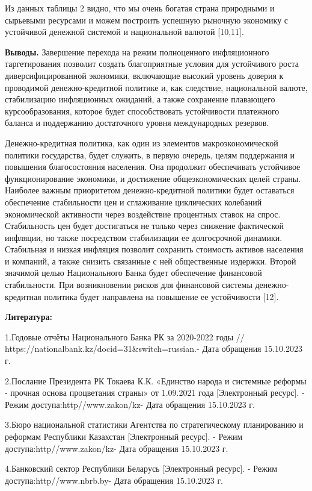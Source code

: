 Из данных таблицы 2 видно, что мы очень богатая страна природными и
сырьевыми ресурсами и можем построить успешную рыночную экономику с
устойчивой денежной системой и национальной валютой {[}10,11{]}.

{\bfseries Выводы.} Завершение перехода на режим полноценного инфляционного
таргетирования позволит создать благоприятные условия для устойчивого
роста диверсифицированной экономики, включающие высокий уровень доверия
к проводимой денежно-кредитной политике и, как следствие, национальной
валюте, стабилизацию инфляционных ожиданий, а также сохранение
плавающего курсообразования, которое будет способствовать устойчивости
платежного баланса и поддержанию достаточного уровня международных
резервов.

Денежно-кредитная политика, как один из элементов макроэкономической
политики государства, будет служить, в первую очередь, целям поддержания
и повышения благосостояния населения. Она продолжит обеспечивать
устойчивое функционирование экономики, и достижение общеэкономических
целей страны. Наиболее важным приоритетом денежно-кредитной политики
будет оставаться обеспечение стабильности цен и сглаживание циклических
колебаний экономической активности через воздействие процентных ставок
на спрос. Стабильность цен будет достигаться не только через снижение
фактической инфляции, но также посредством стабилизации ее долгосрочной
динамики. Стабильная и низкая инфляция позволит сохранить стоимость
активов населения и компаний, а также снизить связанные с ней
общественные издержки. Второй значимой целью Национального Банка будет
обеспечение финансовой стабильности. При возникновении рисков для
финансовой системы денежно-кредитная политика будет направлена на
повышение ее устойчивости {[}12{]}.

{\bfseries Литература:}

1.Годовые отчёты Национального Банка РК за 2020-2022 годы //
https://nationalbank.kz/docid=31\&switch=russian.- Дата обращения
15.10.2023 г.

2.Послание Президента РК Токаева К.К. «Единство народа и системные
реформы - прочная основа процветания страны» от 1.09.2021 года
{[}Электронный ресурс{]}. - Режим доступа:http//www.zakon/kz- Дата
обращения 15.10.2023 г.

3.Бюро национальной статистики Агентства по стратегическому планированию
и реформам Республики Казахстан {[}Электронный ресурс{]}. - Режим
доступа:http//www.zakon/kz- Дата обращения 15.10.2023 г.

4.Банковский сектор Республики Беларусь {[}Электронный ресурс{]}. -
Режим доступа:http//www.nbrb.by- Дата обращения 15.10.2023 г.

